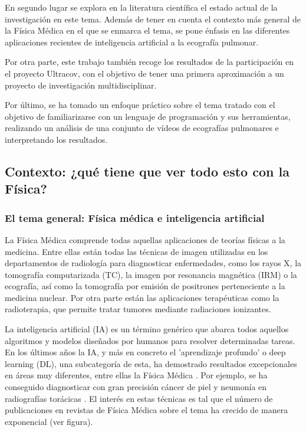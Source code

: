 \documentclass[11pt]{article} %
\begin{document}
	En segundo lugar se explora en la literatura científica el estado actual de la investigación en este tema. Además de tener en cuenta el contexto más general de la Física Médica en el que se enmarca el tema, se pone énfasis en las diferentes aplicaciones recientes de inteligencia artificial a la ecografía pulmonar.

	Por otra parte, este trabajo también recoge los resultados de la participación en el proyecto Ultracov, con el objetivo de tener una primera aproximación a un proyecto de investigación multidisciplinar. 

	Por último, se ha tomado un enfoque práctico sobre el tema tratado con el objetivo de familiarizarse con un lenguaje de programación y sus herramientas, realizando un análisis de una conjunto de vídeos de ecografías pulmonares e interpretando los resultados.

	
	
\subsection{Contexto: ¿qué tiene que ver todo esto con la Física?}

\subsubsection{El tema general: Física médica e inteligencia artificial}
	

	La Física Médica comprende todas aquellas aplicaciones de teorías físicas a la medicina. Entre ellas están todas las técnicas de imagen utilizadas en los departamentos de radiología para diagnosticar enfermedades, como los rayos X, la tomografía computarizada (TC), la imagen por resonancia magnética (IRM) o la ecografía, así como la tomografía por emisión de positrones perteneciente a la medicina nuclear. Por otra parte están las aplicaciones terapéuticas como la radioterapia, que permite tratar tumores mediante radiaciones ionizantes.
	
	La inteligencia artificial (IA) es un término genérico que abarca todos aquellos algoritmos y modelos diseñados por humanos para resolver determinadas tareas. En los últimos años la IA, y más en concreto el 'aprendizaje profundo' o deep learning (DL), una subcategoría de esta, ha demostrado resultados excepcionales en áreas muy diferentes, entre ellas la Física Médica \cite{shen}. Por ejemplo, se ha conseguido diagnosticar con gran precisión cáncer de piel \cite{esteva} y neumonía en radiografías torácicas \cite{rajpurkar}. El interés en estas técnicas es tal que el número de publicaciones en revistas de Física Médica sobre el tema ha crecido de manera exponencial (ver figura).
	
\end{document}
